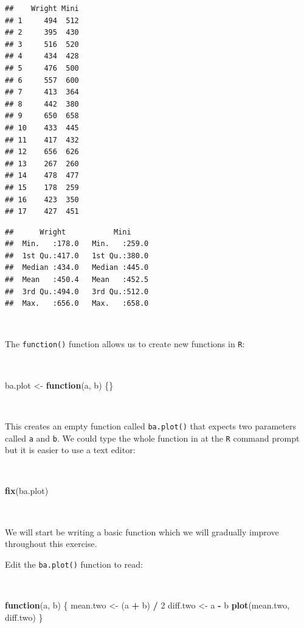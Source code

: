 \documentclass[12pt,a4paper]{book}
\newenvironment{Shaded}{\begin{snugshade}}{\end{snugshade}}
\newcommand{\ControlFlowTok}[1]{\textcolor[rgb]{0.13,0.29,0.53}{\textbf{#1}}}
\newcommand{\DecValTok}[1]{\textcolor[rgb]{0.00,0.00,0.81}{#1}}
\newcommand{\KeywordTok}[1]{\textcolor[rgb]{0.13,0.29,0.53}{\textbf{#1}}}
\newcommand{\NormalTok}[1]{#1}
\newcommand{\OperatorTok}[1]{\textcolor[rgb]{0.81,0.36,0.00}{\textbf{#1}}}
\newcommand{\StringTok}[1]{\textcolor[rgb]{0.31,0.60,0.02}{#1}}
\theoremstyle{definition}
\theoremstyle{definition}
\theoremstyle{definition}
\theoremstyle{remark}
\begin{document}
\begin{verbatim}
##    Wright Mini
## 1     494  512
## 2     395  430
## 3     516  520
## 4     434  428
## 5     476  500
## 6     557  600
## 7     413  364
## 8     442  380
## 9     650  658
## 10    433  445
## 11    417  432
## 12    656  626
## 13    267  260
## 14    478  477
## 15    178  259
## 16    423  350
## 17    427  451
\end{verbatim}

\begin{verbatim}
##      Wright           Mini      
##  Min.   :178.0   Min.   :259.0  
##  1st Qu.:417.0   1st Qu.:380.0  
##  Median :434.0   Median :445.0  
##  Mean   :450.4   Mean   :452.5  
##  3rd Qu.:494.0   3rd Qu.:512.0  
##  Max.   :656.0   Max.   :658.0
\end{verbatim}

~

The \texttt{function()} function allows us to create new functions in
\texttt{R}:

~

\begin{Shaded}
\begin{Highlighting}[]
\NormalTok{ba.plot <-}\StringTok{ }\ControlFlowTok{function}\NormalTok{(a, b) \{\}}
\end{Highlighting}
\end{Shaded}

~

This creates an empty function called \texttt{ba.plot()} that expects
two parameters called \texttt{a} and \texttt{b}. We could type the whole
function in at the \texttt{R} command prompt but it is easier to use a
text editor:

~

\begin{Shaded}
\begin{Highlighting}[]
\KeywordTok{fix}\NormalTok{(ba.plot)}
\end{Highlighting}
\end{Shaded}

~

We will start be writing a basic function which we will gradually
improve throughout this exercise.

Edit the \texttt{ba.plot()} function to read:

~

\begin{Shaded}
\begin{Highlighting}[]
\ControlFlowTok{function}\NormalTok{(a, b) \{}
\NormalTok{  mean.two <-}\StringTok{ }\NormalTok{(a }\OperatorTok{+}\StringTok{ }\NormalTok{b) }\OperatorTok{/}\StringTok{ }\DecValTok{2}
\NormalTok{  diff.two <-}\StringTok{ }\NormalTok{a }\OperatorTok{-}\StringTok{ }\NormalTok{b}
  \KeywordTok{plot}\NormalTok{(mean.two, diff.two)}
\NormalTok{\}}
\end{Highlighting}
\end{Shaded}
\end{document}
